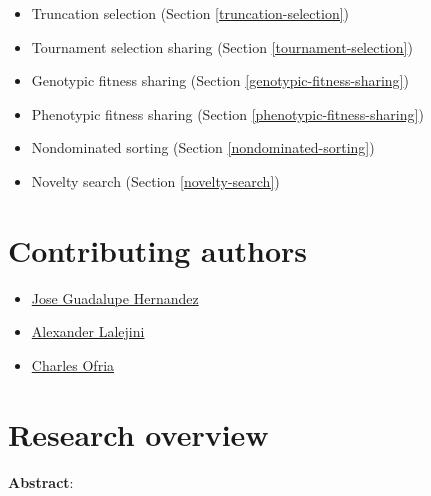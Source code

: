 \documentclass[]{book}
\providecommand{\tightlist}{%
  \setlength{\itemsep}{0pt}\setlength{\parskip}{0pt}}
\begin{document}
\begin{itemize}
\tightlist
\item
  Truncation selection (Section \ref{truncation-selection})
\item
  Tournament selection sharing (Section \ref{tournament-selection})
\item
  Genotypic fitness sharing (Section \ref{genotypic-fitness-sharing})
\item
  Phenotypic fitness sharing (Section \ref{phenotypic-fitness-sharing})
\item
  Nondominated sorting (Section \ref{nondominated-sorting})
\item
  Novelty search (Section \ref{novelty-search})
\end{itemize}

\hypertarget{contributing-authors}{%
\section{Contributing authors}\label{contributing-authors}}

\begin{itemize}
\tightlist
\item
  \href{https://jgh9094.github.io/}{Jose Guadalupe Hernandez}
\item
  \href{https://lalejini.com}{Alexander Lalejini}
\item
  \href{http://ofria.com}{Charles Ofria}
\end{itemize}

\hypertarget{research-overview}{%
\section{Research overview}\label{research-overview}}

\textbf{Abstract}:
\end{document}
